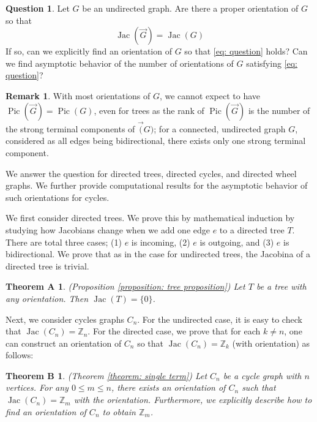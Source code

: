 \documentclass[11pt,reqno]{amsart}
\DeclareMathOperator{\Pic}{Pic}
\DeclareMathOperator{\Jac}{Jac}
\theoremstyle{definition}
\newtheorem{rmk}[mydef]{Remark}
\newtheorem*{que}{Question}
\theoremstyle{plain}
\newtheorem*{nothma}{Theorem A}
\newtheorem*{nothmb}{Theorem B}
\begin{document}
\begin{que}\label{question: main question}
Let $G$ be an undirected graph. Are there a proper orientation of $G$ so that
\begin{equation}\label{eq: question}
\Jac(\vec{G})=\Jac(G)	
\end{equation}
If so, can we explicitly find an orientation of $G$ so that \eqref{eq: question} holds? Can we find asymptotic behavior of the number of orientations of $G$ satisfying \eqref{eq: question}?
\end{que}


\begin{rmk}
With most orientations of $G$, we cannot expect to have $\Pic(\vec{G})=\Pic(G)$, even for trees as the rank of $\Pic(\vec{G})$ is the number of the strong terminal components of $\vec(G)$; for a connected, undirected graph $G$, considered as all edges being bidirectional, there exists only one strong terminal component. 	
\end{rmk}

We answer the question for directed trees, directed cycles, and directed wheel graphs. We further provide computational results for the asymptotic behavior of such orientations for cycles. 



We first consider directed trees. We prove this by mathematical induction by studying how Jacobians change when we add one edge $e$ to a directed tree $T$. There are total three cases; (1) $e$ is incoming, (2) $e$ is outgoing, and (3) $e$ is bidirectional. We prove that as in the case for undirected trees, the Jacobina of a directed tree is trivial.

\begin{nothma}(Proposition \ref{proposition: tree proposition})
Let $T$ be a tree with any orientation. Then $\Jac(T)=\{0\}$. 
\end{nothma}

Next, we consider cycles graphs $C_n$. For the undirected case, it is easy to check that $\Jac(C_n)=\mathbb{Z}_n$. For the directed case, we prove that for each $k \neq n$, one can construct an orientation of $C_n$ so that $\Jac(C_n)=\mathbb{Z}_k$ (with orientation) as follows:

\begin{nothmb}(Theorem \ref{theorem: single term})
Let $C_n$ be a cycle graph with $n$ vertices. For any $0 \leq m \leq n$, there exists an orientation of $C_n$ such that $\Jac(C_n)=\mathbb{Z}_m$ with the orientation. Furthermore, we explicitly describe how to find an orientation of $C_n$ to obtain $\mathbb{Z}_m$. 
\end{nothmb}
\end{document}
